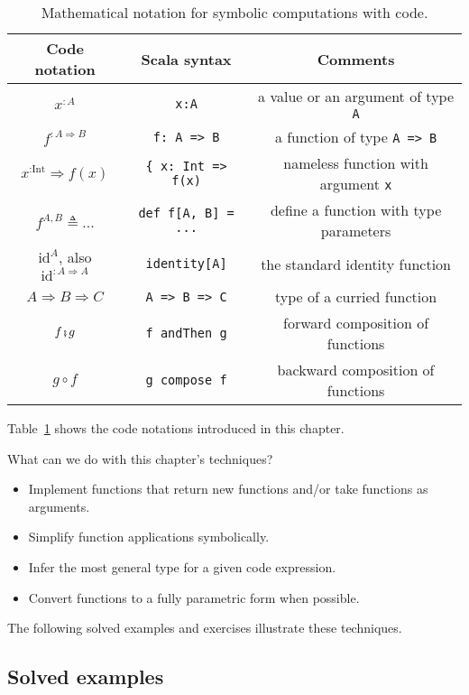 \begin{table}
\begin{centering}
\begin{tabular}{|c|c|c|}
\hline 
\textbf{\small{}Code notation} & \textbf{\small{}Scala syntax} & \textbf{\small{}Comments}\tabularnewline
\hline 
\hline 
{\small{}$x^{:A}$} & {\small{}}\lstinline!x:A! & {\small{}a value or an argument of type }\lstinline!A!\tabularnewline
\hline 
{\small{}$f^{:A\Rightarrow B}$} & {\small{}}\lstinline!f: A => B! & {\small{}a function of type }\lstinline!A => B!\tabularnewline
\hline 
{\small{}$x^{:\text{Int}}\Rightarrow f(x)$} & {\small{}}\lstinline!{ x: Int => f(x)! & {\small{}nameless function with argument }\lstinline!x!\tabularnewline
\hline 
{\small{}$f^{A,B}\triangleq...$} & {\small{}}\lstinline!def f[A, B] = ...! & {\small{}define a function with type parameters}\tabularnewline
\hline 
{\small{}$\text{id}^{A}$, also $\text{id}^{:A\Rightarrow A}$} & {\small{}}\lstinline!identity[A]! & {\small{}the standard identity function}\tabularnewline
\hline 
{\small{}$A\Rightarrow B\Rightarrow C$} & {\small{}}\lstinline!A => B => C! & {\small{}type of a curried function}\tabularnewline
\hline 
{\small{}$f\bef g$} & {\small{}}\lstinline!f andThen g! & {\small{}forward composition of functions}\tabularnewline
\hline 
{\small{}$g\circ f$} & {\small{}}\lstinline!g compose f! & {\small{}backward composition of functions}\tabularnewline
\hline 
\end{tabular}
\par\end{centering}
\caption{Mathematical notation for symbolic computations with code.\label{tab:Mathematical-notation-for-code}}
\end{table}
Table~\ref{tab:Mathematical-notation-for-code} shows the code notations
introduced in this chapter. 

What can we do with this chapter's techniques?
\begin{itemize}
\item Implement functions that return new functions and/or take functions
as arguments.
\item Simplify function applications symbolically.
\item Infer the most general type for a given code expression.
\item Convert functions to a fully parametric form when possible.
\end{itemize}
The following solved examples and exercises illustrate these techniques.

\subsection{Solved examples}

